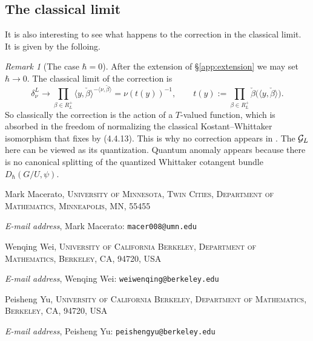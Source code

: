 \documentclass{article}
\makeatletter
\theoremstyle{plain}
\theoremstyle{definition}
\theoremstyle{remark}
\newtheorem{remark}[theorem]{Remark}
\numberwithin{equation}{section}
\newcommand{\Addresses}{{
  \bigskip
  \footnotesize

  Mark Macerato, \textsc{University of Minnesota, Twin Cities, Department of Mathematics, Minneapolis, MN, 55455}\par\nopagebreak
  \textit{E-mail address}, Mark Macerato: \texttt{macer008@umn.edu}

  \medskip

  Wenqing Wei, \textsc{University of California Berkeley, Department of Mathematics, Berkeley, CA, 94720, USA}\par\nopagebreak
  \textit{E-mail address}, Wenqing Wei: \texttt{weiwenqing@berkeley.edu}

  \medskip

  Peisheng Yu, \textsc{University of California Berkeley, Department of Mathematics, Berkeley, CA, 94720, USA}\par\nopagebreak
  \textit{E-mail address}, Peisheng Yu: \texttt{peishengyu@berkeley.edu}

}}
\makeatother
\begin{document}
\subsection*{The classical limit}
It is also interesting to see what happens to the correction in the classical limit. It is given by the folloing.
\begin{remark}[The case $\hbar=0$]\label{rem:hbar0}
After the extension of \S\ref{app:extension} we may set $\hbar\to0$. The classical limit of the correction is
\[
\delta^L_\nu\longrightarrow\prod_{\beta\in R_L^+}\langle y,\check\beta\rangle^{-\langle\nu,\check\beta\rangle}=\nu(t(y))^{-1},\qquad t(y):=\prod_{\beta\in R_L^+}\check\beta\bigl(\langle y,\check\beta\rangle\bigr).
\]
So classically the correction is the action of a $T$-valued function, which is absorbed in the freedom of normalizing the classical Kostant--Whittaker isomorphism that \cite{macerato2023leviequivariantrestrictionsphericalperverse} fixes by (4.4.13). This is why no correction appears in \cite[proof of Theorem 4.4.5]{macerato2023leviequivariantrestrictionsphericalperverse}. The $\mathcal G_L$ here can be viewed as its quantization. Quantum anomaly appears because there is no canonical splitting of the quantized Whittaker cotangent bundle $D_\hbar(G/U,\psi)$.
\end{remark}




\Addresses
\end{document}
